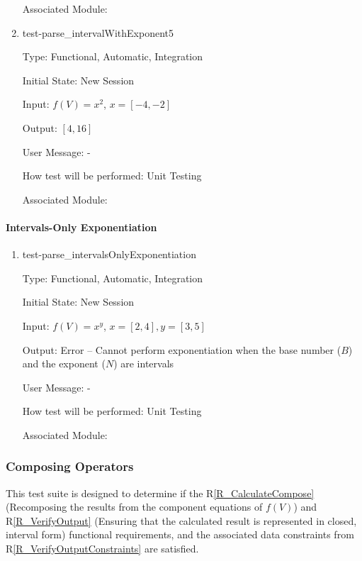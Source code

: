 \documentclass[12pt, titlepage]{article}
\newcommand{\rref}[1]{R\ref{#1}}
\begin{document}
\begin{enumerate}
	Associated Module: \\
	
	\item{test-parse\_intervalWithExponent5}
	
	Type: Functional, Automatic, Integration
	
	Initial State: New Session
	
	Input: $f(V) = x^2$, $x = [-4,-2]$
	
	Output: $[4,16]$
	
	User Message: - 
	
	How test will be performed: Unit Testing
	
	Associated Module: \\
	
\end{enumerate}

\paragraph{Intervals-Only Exponentiation}

\begin{enumerate}
	
	\item{test-parse\_intervalsOnlyExponentiation}
	
	Type: Functional, Automatic, Integration
	
	Initial State: New Session
	
	Input: $f(V) = x^y$, $x = [2,4], y = [3,5]$
	
	Output: Error -- Cannot perform exponentiation when the base number ($B$) 
	and the exponent ($N$) are intervals
	
	User Message: - 
	
	How test will be performed: Unit Testing
	
	Associated Module: \\
	
\end{enumerate}

\subsubsection{Composing Operators}
\label{tests_operatorComposition}
This test suite is designed to determine if the
\rref{R_CalculateCompose} (Recomposing the results from the component equations 
of $f(V)$) and \rref{R_VerifyOutput} (Ensuring that the calculated result is
represented in closed, interval form) functional requirements, and the
associated data constraints from \rref{R_VerifyOutputConstraints} are
satisfied.
\end{document}
